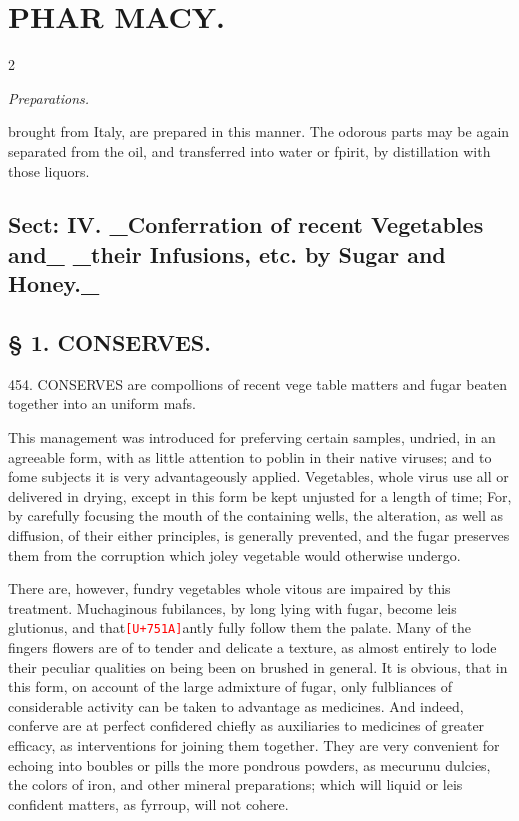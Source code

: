 \documentclass[10pt]{article}
\newcommand{\unk}[1]{\textcolor{red}{\texttt{\scriptsize[U+#1]}}}
\begin{document}
\section*{\centering PHAR MACY.}
\begin{multicols}{2}\raggedcolumns
\begin{center}\small\itshape Preparations.\end{center}
brought from Italy, are prepared in this manner. The odorous parts may be again separated from the oil, and transferred into water or fpirit, by distillation with those liquors.

\subsection*{Sect: IV. \_Conferration of recent Vegetables and\_ \_their Infusions, etc. by Sugar and Honey.\_}
\subsection*{§ 1. CONSERVES.}
454. CONSERVES are compollions of recent vege table matters and fugar beaten together into an uniform mafs.

This management was introduced for preferving certain samples, undried, in an agreeable form, with as little attention to poblin in their native viruses; and to fome subjects it is very advantageously applied. Vegetables, whole virus use all or delivered in drying, except in this form be kept unjusted for a length of time; For, by carefully focusing the mouth of the containing wells, the alteration, as well as diffusion, of their either principles, is generally prevented, and the fugar preserves them from the corruption which joley vegetable would otherwise undergo.

There are, however, fundry vegetables whole vitous are impaired by this treatment. Muchaginous fubilances, by long lying with fugar, become leis glutionus, and that\unk{751A}antly fully follow them the palate. Many of the fingers flowers are of to tender and delicate a texture, as almost entirely to lode their peculiar qualities on being been on brushed in general. It is obvious, that in this form, on account of the large admixture of fugar, only fulbliances of considerable activity can be taken to advantage as medicines. And indeed, conferve are at perfect confidered chiefly as auxiliaries to medicines of greater efficacy, as interventions for joining them together. They are very convenient for echoing into boubles or pills the more pondrous powders, as mecurunu dulcies, the colors of iron, and other mineral preparations; which will liquid or leis confident matters, as fyrroup, will not cohere.


\end{multicols}
\end{document}
